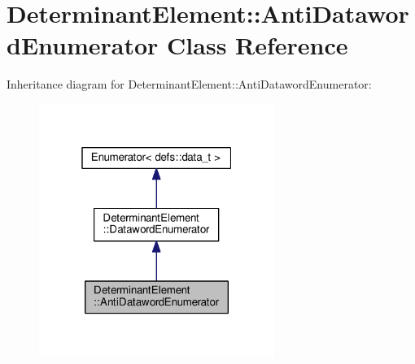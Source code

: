 \hypertarget{classDeterminantElement_1_1AntiDatawordEnumerator}{}\section{Determinant\+Element\+:\+:Anti\+Dataword\+Enumerator Class Reference}
\label{classDeterminantElement_1_1AntiDatawordEnumerator}


Inheritance diagram for Determinant\+Element\+:\+:Anti\+Dataword\+Enumerator\+:\nopagebreak
\begin{figure}[H]
\begin{center}
\leavevmode
\includegraphics[width=217pt]{classDeterminantElement_1_1AntiDatawordEnumerator__inherit__graph}
\end{center}
\end{figure}


